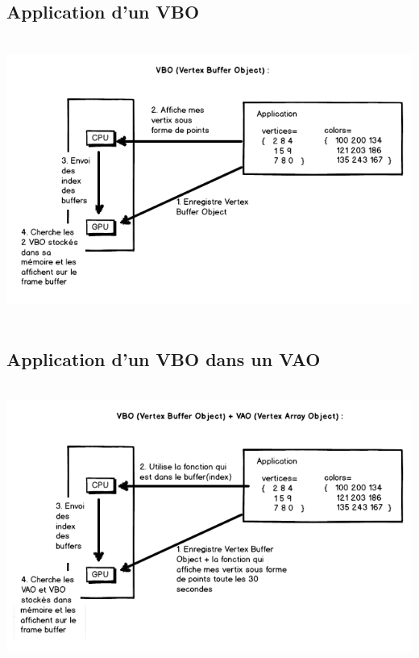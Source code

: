 \subsection{Application d'un VBO}
\includegraphics[width=15cm,height=9.26cm]{img/VBO.png}
\subsection{Application d'un VBO dans un VAO}
\includegraphics[width=15cm,height=9.21cm]{img/VAO_VBO.png}
